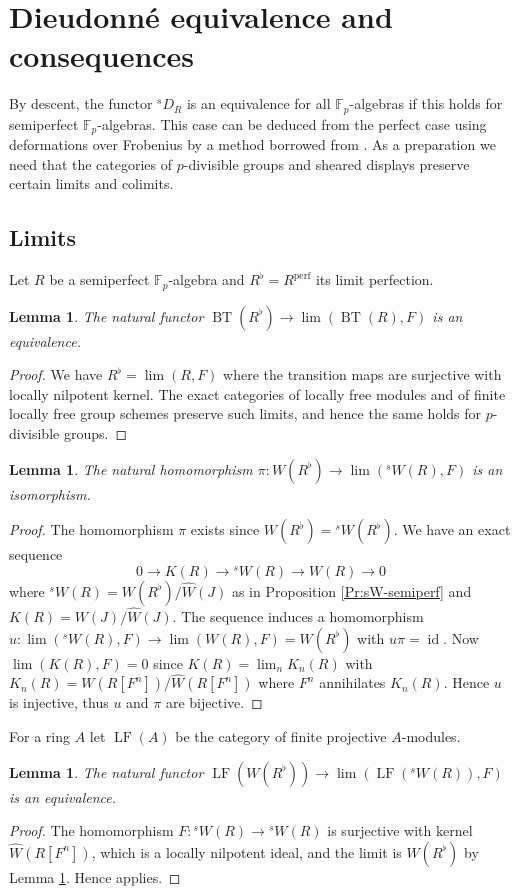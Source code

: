 \documentclass[a4paper,11pt]{amsart}
\theoremstyle{plain}
\newtheorem{Lemma}[equation]{Lemma}
\theoremstyle{definition}
\theoremstyle{remark}
\newcommand{\bLe}{\begin{Lemma}}
\newcommand{\eLe}{\end{Lemma}}
\newcommand{\bproof}{\begin{proof}}
\newcommand{\eproof}{\end{proof}}
\newcommand{\beqn}{\begin{equation}}
\newcommand{\eeqn}{\end{equation}}
\numberwithin{equation}{section}
\newcommand{\FF}{{\mathbb{F}}}
\DeclareMathOperator{\id}{id}
\DeclareMathOperator{\perf}{perf}
\DeclareMathOperator{\BT}{BT}
\DeclareMathOperator{\LF}{LF}
\newcommand{\limperf}{^{\perf}}
\newcommand{\sD}{{}^{s\!}D}
\newcommand{\sW}{{}^sW}
\newcommand{\cclearpage}{}%
\begin{document}
\cclearpage
\section{Dieudonn\'e equivalence and consequences}

By descent, the functor $\sD_R$ is an equivalence for all $\FF_p$-algebras if this holds for semiperfect $\FF_p$-algebras. This case can be deduced from the perfect case using deformations over Frobenius by a method borrowed from \cite[\S5.2]{Lau:Semiperf}. As a preparation we need that the categories of $p$-divisible groups and sheared displays preserve certain limits and colimits. 

\subsection{Limits}
\label{Se:Dieud-equiv:limits}

Let $R$ be a semiperfect $\FF_p$-algebra and $R^\flat=R\limperf$ its limit perfection.

\bLe
\label{Le:BTRflat-limBTRF}
The natural functor $\BT(R^\flat)\to\lim(\BT(R),F)$ is an equivalence.
\eLe

\bproof
We have $R^\flat=\lim(R,F)$ where the transition maps are surjective with locally nilpotent kernel. The exact categories of locally free modules and of finite locally free group schemes preserve such limits, and hence the same holds for $p$-divisible groups.
\eproof

\bLe
\label{Le:WRflat-limsWRF}
The natural homomorphism $\pi\colon W(R^\flat)\to\lim(\sW(R),F)$ is an isomorphism.
\eLe

\bproof
The homomorphism $\pi$ exists since $W(R^\flat)=\sW(R^\flat)$.
We have an exact sequence 
\beqn
\label{Eq:KR-sWR-WR}
0\to K(R)\to\sW(R)\to W(R)\to 0
\eeqn
where $\sW(R)=W(R^\flat)/\hat W(J)$ as in Proposition \ref{Pr:sW-semiperf} and $K(R)=W(J)/\hat W(J)$. The sequence induces a homomorphism
$u\colon \lim(\sW(R),F)\to\lim(W(R),F)=W(R^\flat)$ with $u\pi=\id$.
Now $\lim(K(R),F)=0$ since $K(R)=\lim_nK_n(R)$ with $K_n(R)=W(R[F^n])/\hat W(R[F^n])$ where $F^n$ annihilates $K_n(R)$. Hence $u$ is injective, thus $u$ and $\pi$ are bijective.
\eproof

For a ring $A$ let $\LF(A)$ be the category of finite projective $A$-modules.

\bLe
The natural functor $\LF(W(R^\flat))\to\lim(\LF(\sW(R)),F)$ is an equivalence.
\eLe

\bproof
The homomorphism $F\colon \sW(R)\to\sW(R)$ is surjective with kernel $\hat W(R[F^n])$, which is a locally nilpotent ideal, and the limit is $W(R^\flat)$ by Lemma \ref{Le:WRflat-limsWRF}. Hence \cite[\href{https://stacks.math.columbia.edu/tag/0D4B}{Lemma 0D4B}]{Stacks} applies.
\eproof
\end{document}
